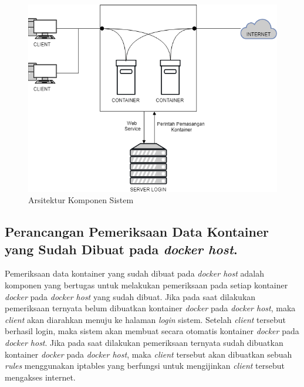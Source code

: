       \begin{figure}[H]
        \centering
        \includegraphics[width=\linewidth]{images/bab3/arsitekttur_komponen}
        \caption{Arsitektur Komponen Sistem}
        \label{Arsitektur Komponen Sistem}
      \end{figure} 
    \subsection{Perancangan Pemeriksaan Data Kontainer yang Sudah Dibuat pada \textit{docker host}.}
    Pemeriksaan data kontainer yang sudah dibuat pada \textit{docker host} adalah komponen yang bertugas untuk melakukan pemeriksaan pada setiap kontainer \textit{docker} pada \textit{docker host} yang sudah dibuat. Jika pada saat dilakukan pemeriksaan ternyata belum dibuatkan kontainer \textit{docker} pada \textit{docker host}, maka \textit{client} akan diarahkan menuju ke halaman \textit{login} sistem. Setelah \textit{client} tersebut berhasil login, maka sistem akan membuat secara otomatis kontainer \textit{docker} pada \textit{docker host}. Jika pada saat dilakukan pemeriksaan ternyata sudah dibuatkan kontainer \textit{docker} pada \textit{docker host}, maka \textit{client} tersebut akan dibuatkan sebuah \textit{rules} menggunakan iptables yang berfungsi untuk mengijinkan \textit{client} tersebut mengakses internet.
    
